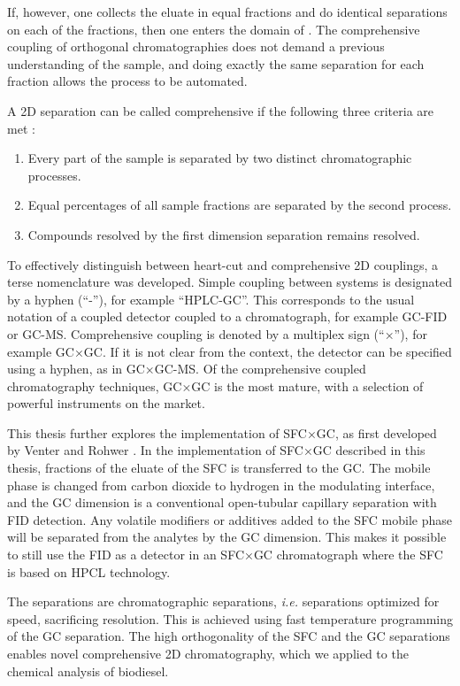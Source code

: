 If, however, one collects the eluate in equal fractions and do identical
separations on each of the fractions, then one enters the domain of
. The comprehensive coupling of
orthogonal chromatographies does not demand a previous understanding of the
sample, and doing exactly the same separation for each fraction allows the
process to be automated.

A 2D separation can be called comprehensive if the following three criteria are
met \autocite{Giddings1987}:

\begin{enumerate}
  \item Every part of the sample is separated by two distinct chromatographic processes.
  \item Equal percentages of all sample fractions are separated by the second process.	 
  \item Compounds resolved by the first dimension separation remains resolved.  
\end{enumerate} 

To effectively distinguish between heart-cut and comprehensive 2D couplings, a
terse nomenclature was developed. Simple coupling between systems is designated
by a hyphen (``-''), for example ``HPLC-GC''. This corresponds to the usual
notation of a coupled detector coupled to a chromatograph, for example GC-FID or
GC-MS. Comprehensive coupling is denoted by a multiplex sign (``×''), for
example GC×GC. If it is not clear from the context, the detector can be
specified using a hyphen, as in GC×GC-MS. Of the comprehensive coupled
chromatography techniques, GC×GC is the most mature, with a selection of
powerful instruments on the market.

This thesis further explores the implementation of SFC×GC, as first developed by
Venter and Rohwer \autocite{Venter2004, Venter2006}. In the implementation of
SFC×GC described in this thesis, fractions of the eluate of the SFC is
transferred to the GC. The mobile phase is changed from carbon dioxide to
hydrogen in the modulating interface, and the GC dimension is a conventional
open-tubular capillary separation with FID detection. Any volatile modifiers or
additives added to the SFC mobile phase will be separated from the analytes by
the GC dimension. This makes it possible to still use the FID as a detector in
an SFC×GC chromatograph where the SFC is based on HPCL technology.

The \twoD separations are  chromatographic separations,
\textit{i.e.} separations optimized for speed, sacrificing resolution. This is
achieved using fast temperature programming of the GC separation. The high
orthogonality of the SFC and the GC separations enables novel comprehensive 2D
chromatography, which we applied to the chemical analysis of biodiesel.
